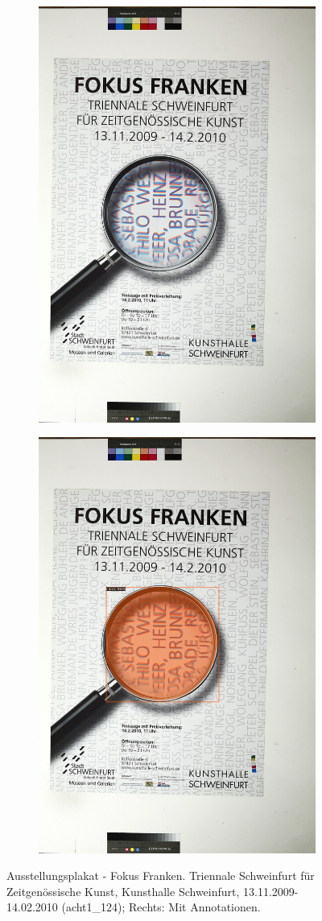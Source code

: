 \documentclass[a4paper,12pt,ngerman]{article}
\begin{document}
\newpage
\begin{landscape}
\begin{figure}[ht]
	\begin{subfigure}[b]{0.5\linewidth}
	\centering
	\includegraphics[height=\linewidth]{Abbildung_44_(acht1_124)}
	\end{subfigure}
	\begin{subfigure}[b]{0.5\linewidth}
	\centering
	\includegraphics[height=\linewidth]{Abbildung_44_(acht1_124)_with_detections}
	\end{subfigure}
	\caption{Ausstellungsplakat - Fokus Franken. Triennale Schweinfurt für Zeitgenössische Kunst, Kunsthalle Schweinfurt, 13.11.2009-14.02.2010 (acht1\_124); Rechts: Mit Annotationen.}
\end{figure}
\end{landscape}
\end{document}
